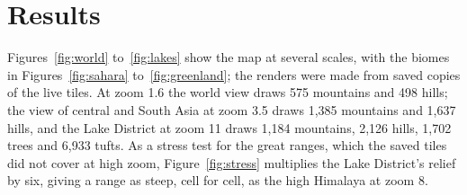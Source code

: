 \documentclass[11pt,a4paper]{article}
\begin{document}
\section{Results}
Figures~\ref{fig:world} to~\ref{fig:lakes} show the map at several scales, with the biomes in Figures~\ref{fig:sahara} to~\ref{fig:greenland}; the renders were made from saved copies of the live tiles. At zoom 1.6 the world view draws 575 mountains and 498 hills; the view of central and South Asia at zoom 3.5 draws 1,385 mountains and 1,637 hills, and the Lake District at zoom 11 draws 1,184 mountains, 2,126 hills, 1,702 trees and 6,933 tufts. As a stress test for the great ranges, which the saved tiles did not cover at high zoom, Figure~\ref{fig:stress} multiplies the Lake District's relief by six, giving a range as steep, cell for cell, as the high Himalaya at zoom 8.
\end{document}
